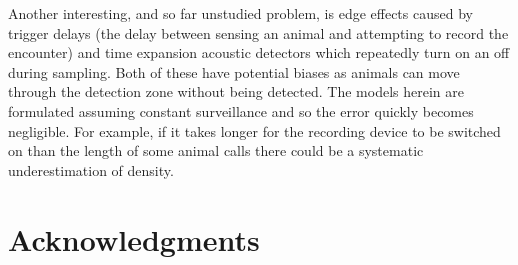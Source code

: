 \documentclass[a4paper,10pt,reqno,oneside]{amsart}
\begin{document}
Another interesting, and so far unstudied problem, is edge effects caused by trigger delays (the delay between sensing an animal and attempting to record the encounter) and time expansion acoustic detectors which repeatedly turn on an off during sampling. Both of these have potential biases as animals can move through the detection zone without being detected. The models herein are formulated assuming constant surveillance and so the error quickly becomes negligible. For example, if it takes longer for the recording device to be switched on than the length of some animal calls there could be a systematic underestimation of density. 

\section{Acknowledgments}



	
	
\end{document}
